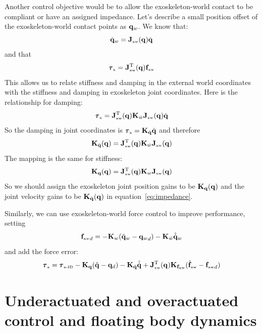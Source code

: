 \documentclass[letterpaper,12pt,fullpage]{article}
\newcommand{\myx}{{\mbox {\tiny x}}}
\newcommand{\xw}{{\mbox {\tiny xw}}}
\newcommand{\xinvdyn}{{\mbox {\tiny x-ID}}}
\begin{document}
Another control objective would be to allow the exoskeleton-world contact to
be compliant or have an assigned impedance.
Let's describe a small position offset of the exoskeleton-world
contact points as ${\bf q}_w$. We know that:
\begin{equation}
\dot{\vq}_w = \mJ_{\xw}(\vq) \dot{\vq}
\end{equation}
and that
\begin{equation}
\vtau_{\myx} = \mJ_{\xw}^{\tr}(\vq) \vf_{\xw} 
\end{equation}
This allows us to relate stiffness and damping in the external world coordinates
with the stiffness and damping in exoskeleton joint coordinates.
Here is the relationship for damping:
\begin{equation}
\vtau_{\myx} = \mJ_{\xw}^{\tr}(\vq) \mK_{\dot{w}} \mJ_{\xw}(\vq) \dot{\vq}
\end{equation}
So the damping in joint coordinates is $\vtau_{\myx} = \mK_{\dot{\vq}} \dot{\vq}$ and
therefore
\begin{equation}
\mK_{\dot{\vq}}(\vq) = \mJ_{\xw}^{\tr}(\vq) \mK_{\dot{w}} \mJ_{\xw}(\vq)
\end{equation}
The mapping is the same for stiffness:
\begin{equation}
\mK_{\vq}(\vq) = \mJ_{\xw}^{\tr}(\vq) \mK_{w} \mJ_{\xw}(\vq)
\end{equation}
So we should assign the exoskeleton joint position gains to be ${\bf K}_{{\bf q}}({\bf q})$ and
the joint velocity gains to be ${\bf K}_{\dot{{\bf q}}}({\bf q})$ in equation~\ref{eq:impedance}.

Similarly, we can use exoskeleton-world force control to improve performance,
setting
\begin{equation}
{\vf_{\xw}}_d = - \mK_w ( \hat{\vq}_w - {\vq_w}_d ) - \mK_{\dot{w}} \hat{\dot{\vq}}_w
\end{equation}
and add the force error: 
\begin{equation}
\vtau_{\myx} = \vtau_{\xinvdyn} - \mK_{\vq} ( \hat{\vq} - \vq_d ) - \mK_{\dot{\vq}} \hat{\dot{\vq}}
+ \mJ_{\xw}^{\tr}(\vq) \mK_{\vf_{\xw}} ( \hat{\vf}_{\xw} - {\vf_{\xw}}_d )
\end{equation}

\section{Underactuated and overactuated control and floating body dynamics}
\label{sec:float}
\end{document}
